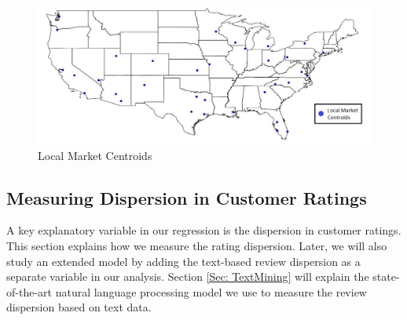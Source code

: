 \documentclass[mnsc,blindrev]{informs3}
\begin{document}
	
	
	
	
	
	
	
	\begin{figure}
		\centering
		\includegraphics[width=1\linewidth]{markets.jpg}
		\caption{Local Market Centroids}
		\label{fig: markets}
	\end{figure}
	
	\subsection{Measuring Dispersion in Customer Ratings} \label{Subsec: Measure Dispersion}
	
	A key explanatory variable in our regression is the dispersion in customer ratings. This section explains how we measure the rating dispersion. Later, we will also study an extended model by adding the text-based review dispersion as a separate variable in our analysis.  Section \ref{Sec: TextMining} will explain the state-of-the-art natural language processing model we use to measure the review dispersion based on text data.
	
	
\end{document}

